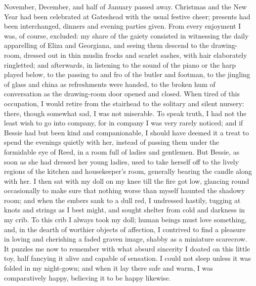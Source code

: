 November, December, and half of January passed away. Christmas and the
New Year had been celebrated at Gateshead with the usual festive cheer;
presents had been interchanged, dinners and evening parties given. From
every enjoyment I was, of course, excluded: my share of the gaiety
consisted in witnessing the daily apparelling of Eliza and Georgiana,
and seeing them descend to the drawing-room, dressed out in thin muslin
frocks and scarlet sashes, with hair elaborately ringletted; and
afterwards, in listening to the sound of the piano or the harp played
below, to the passing to and fro of the butler and footman, to the
jingling of glass and china as refreshments were handed, to the broken
hum of conversation as the drawing-room door opened and closed. When
tired of this occupation, I would retire from the stairhead to the
solitary and silent nursery: there, though somewhat sad, I was not
miserable. To speak truth, I had not the least wish to go into company,
for in company I was very rarely noticed; and if Bessie had but been
kind and companionable, I should have deemed it a treat to spend the
evenings quietly with her, instead of passing them under the formidable
eye of \Mrs{} Reed, in a room full of ladies and gentlemen. But Bessie,
as soon as she had dressed her young ladies, used to take herself off to
the lively regions of the kitchen and housekeeper's room, generally
bearing the candle along with her. I then sat with my doll on my knee
till the fire got low, glancing round occasionally to make sure that
nothing worse than myself haunted the shadowy room; and when the embers
sank to a dull red, I undressed hastily, tugging at knots and strings as
I best might, and sought shelter from cold and darkness in my crib. To
this crib I always took my doll; human beings must love something, and,
in the dearth of worthier objects of affection, I contrived to find a
pleasure in loving and cherishing a faded graven image, shabby as a
miniature scarecrow. It puzzles me now to remember with what absurd
sincerity I doated on this little toy, half fancying it alive and
capable of sensation. I could not sleep unless it was folded in my
night-gown; and when it lay there safe and warm, I was comparatively
happy, believing it to be happy likewise.

